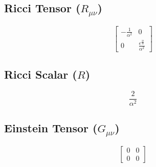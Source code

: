 \documentclass{article}
\begin{document}
\subsection*{Ricci Tensor ($R_{\mu\nu}$)}
\[
\left[\begin{matrix}- \frac{1}{\alpha^{2}} & 0\\0 & \frac{e^{\frac{2 t}{\alpha}}}{\alpha^{2}}\end{matrix}\right]
\]
\vspace{1em}
\subsection*{Ricci Scalar ($R$)}
\[
\frac{2}{\alpha^{2}}
\]
\vspace{1em}
\subsection*{Einstein Tensor ($G_{\mu\nu}$)}
\[
\left[\begin{matrix}0 & 0\\0 & 0\end{matrix}\right]
\]
\vspace{1em}
\end{document}
